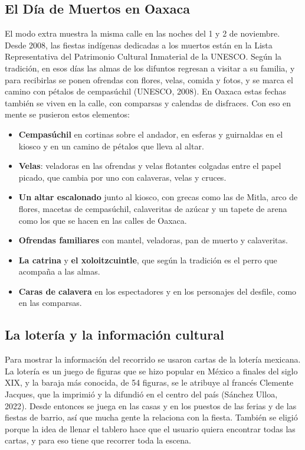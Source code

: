 \documentclass[11pt,a4paper]{article}
\begin{document}
\subsection{El Día de Muertos en Oaxaca}

El modo extra muestra la misma calle en las noches del 1 y 2 de noviembre. Desde 2008, las fiestas indígenas dedicadas a los muertos están en la Lista Representativa del Patrimonio Cultural Inmaterial de la UNESCO. Según la tradición, en esos días las almas de los difuntos regresan a visitar a su familia, y para recibirlas se ponen ofrendas con flores, velas, comida y fotos, y se marca el camino con pétalos de cempasúchil (UNESCO, 2008). En Oaxaca estas fechas también se viven en la calle, con comparsas y calendas de disfraces. Con eso en mente se pusieron estos elementos:

\begin{itemize}
  \item \textbf{Cempasúchil} en cortinas sobre el andador, en esferas y guirnaldas en el kiosco y en un camino de pétalos que lleva al altar.
  \item \textbf{Velas}: veladoras en las ofrendas y velas flotantes colgadas entre el papel picado, que cambia por uno con calaveras, velas y cruces.
  \item \textbf{Un altar escalonado} junto al kiosco, con grecas como las de Mitla, arco de flores, macetas de cempasúchil, calaveritas de azúcar y un tapete de arena como los que se hacen en las calles de Oaxaca.
  \item \textbf{Ofrendas familiares} con mantel, veladoras, pan de muerto y calaveritas.
  \item \textbf{La catrina} y \textbf{el xoloitzcuintle}, que según la tradición es el perro que acompaña a las almas.
  \item \textbf{Caras de calavera} en los espectadores y en los personajes del desfile, como en las comparsas.
\end{itemize}

\subsection{La lotería y la información cultural}
\label{sec:loteria}

Para mostrar la información del recorrido se usaron cartas de la lotería mexicana. La lotería es un juego de figuras que se hizo popular en México a finales del siglo XIX, y la baraja más conocida, de 54 figuras, se le atribuye al francés Clemente Jacques, que la imprimió y la difundió en el centro del país (Sánchez Ulloa, 2022). Desde entonces se juega en las casas y en los puestos de las ferias y de las fiestas de barrio, así que mucha gente la relaciona con la fiesta. También se eligió porque la idea de llenar el tablero hace que el usuario quiera encontrar todas las cartas, y para eso tiene que recorrer toda la escena.
\end{document}
